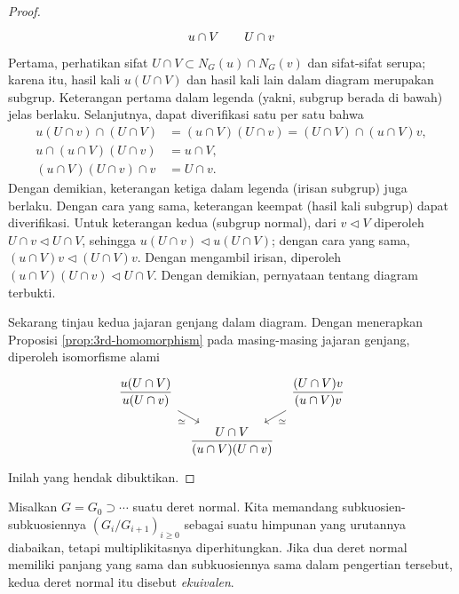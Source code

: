 \begin{proof}
\[\begin{tikzcd}[column sep=tiny]
		& u \cap V & & U \cap v &
	\end{tikzcd} \]
	Pertama, perhatikan sifat $U \cap V \subset N_G(u) \cap N_G(v)$ dan sifat-sifat serupa; karena itu, hasil kali $u(U \cap V)$ dan hasil kali lain dalam diagram merupakan subgrup. Keterangan pertama dalam legenda (yakni, subgrup berada di bawah) jelas berlaku. Selanjutnya, dapat diverifikasi satu per satu bahwa
	\begin{align*}
		u(U \cap v) \cap (U \cap V) & = (u \cap V)(U \cap v) = (U \cap V) \cap (u \cap V)v, \\
		u \cap (u \cap V)(U \cap v) & = u \cap V, \\
		(u \cap V)(U \cap v) \cap v & = U \cap v.
	\end{align*}
	Dengan demikian, keterangan ketiga dalam legenda (irisan subgrup) juga berlaku. Dengan cara yang sama, keterangan keempat (hasil kali subgrup) dapat diverifikasi. Untuk keterangan kedua (subgrup normal), dari $v \lhd V$ diperoleh $U \cap v \lhd U \cap V$, sehingga $u(U \cap v) \lhd u(U \cap V)$; dengan cara yang sama, $(u \cap V)v \lhd (U \cap V)v$. Dengan mengambil irisan, diperoleh $(u \cap V)(U \cap v) \lhd U \cap V$. Dengan demikian, pernyataan tentang diagram terbukti.

	Sekarang tinjau kedua jajaran genjang dalam diagram. Dengan menerapkan Proposisi \ref{prop:3rd-homomorphism} pada masing-masing jajaran genjang, diperoleh isomorfisme alami
	\begin{equation*}\begin{tikzcd}[column sep=tiny, row sep=small]
		\dfrac{u (U \cap V)}{u(U \cap v)} \arrow[rd, "\simeq"'] &  & \dfrac{(U \cap V)v}{(u \cap V)v} \arrow[ld, "\simeq"] \\
		& \dfrac{U \cap V}{(u \cap V)(U \cap v)} &
	\end{tikzcd}\end{equation*}
	Inilah yang hendak dibuktikan.
\end{proof}

\begin{definition}\label{def:JH-subquotients}
	Misalkan $G = G_0 \supset \cdots$ suatu deret normal. Kita memandang subkuosien-subkuosiennya $(G_i/G_{i+1})_{i \geq 0}$ sebagai suatu himpunan yang urutannya diabaikan, tetapi multiplikitasnya diperhitungkan. Jika dua deret normal memiliki panjang yang sama dan subkuosiennya sama dalam pengertian tersebut, kedua deret normal itu disebut \emph{ekuivalen}.
\end{definition}

